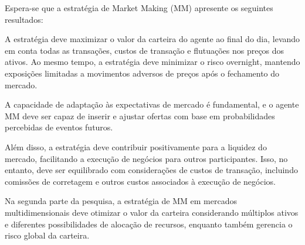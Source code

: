 
Espera-se que a estratégia de Market Making (MM) apresente os seguintes resultados:

A estratégia deve maximizar o valor da carteira do agente ao final do dia, levando em conta todas as transações, custos de transação e flutuações nos preços dos ativos. Ao mesmo tempo, a estratégia deve minimizar o risco overnight, mantendo exposições limitadas a movimentos adversos de preços após o fechamento do mercado.

A capacidade de adaptação às expectativas de mercado é fundamental, e o agente MM deve ser capaz de inserir e ajustar ofertas com base em probabilidades percebidas de eventos futuros.

Além disso, a estratégia deve contribuir positivamente para a liquidez do mercado, facilitando a execução de negócios para outros participantes. Isso, no entanto, deve ser equilibrado com considerações de custos de transação, incluindo comissões de corretagem e outros custos associados à execução de negócios.

Na segunda parte da pesquisa, a estratégia de MM em mercados multidimensionais deve otimizar o valor da carteira considerando múltiplos ativos e diferentes possibilidades de alocação de recursos, enquanto também gerencia o risco global da carteira.



